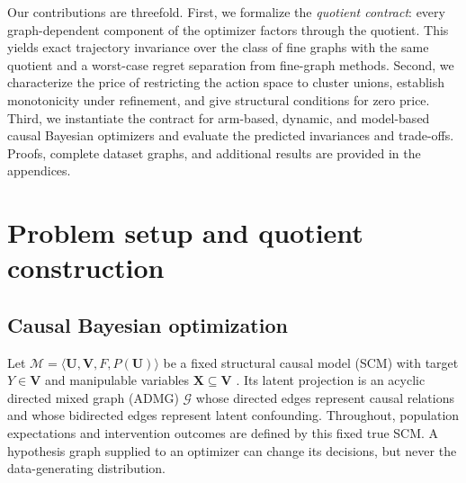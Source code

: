 \documentclass[twoside]{article}
\newcommand{\Gg}{\mathcal{G}}
\begin{document}
Our contributions are threefold. First, we formalize the \emph{quotient
contract}: every graph-dependent component of the optimizer factors through
the quotient. This yields exact trajectory invariance over the class of fine
graphs with the same quotient and a worst-case regret separation from
fine-graph methods. Second, we characterize the price of restricting the
action space to cluster unions, establish monotonicity under refinement, and
give structural conditions for zero price. Third, we instantiate the
contract for arm-based, dynamic, and model-based causal Bayesian optimizers
and evaluate the predicted invariances and trade-offs. Proofs, complete
dataset graphs, and additional results are provided in the appendices.

\section{Problem setup and quotient construction}
\label{sec:setup}

\subsection{Causal Bayesian optimization}

Let
$\mathcal M=\langle\mathbf U,\mathbf V,F,P(\mathbf U)\rangle$ be a fixed
structural causal model (SCM) with target $Y\in\mathbf V$ and manipulable
variables $\mathbf X\subseteq\mathbf V$ \citep{pearlCausality2009}. Its
latent projection is an acyclic directed mixed graph (ADMG) $\Gg$ whose
directed edges represent causal relations and whose bidirected edges
represent latent confounding. Throughout, population expectations and
intervention outcomes are defined by this fixed true SCM. A hypothesis graph
supplied to an optimizer can change its decisions, but never the
data-generating distribution.
\end{document}
